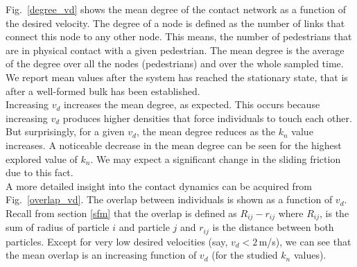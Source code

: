 \documentclass[preprint,12pt]{elsarticle}
\begin{document}
Fig.~\ref{degree_vd} shows the mean degree of the contact network as a function  
of the desired velocity. The degree of a node is defined as the number of links 
that connect this node to any other node. This means, the number of pedestrians 
that are in physical contact with a given pedestrian. The mean degree is the 
average of the degree over all the nodes (pedestrians) and over the whole 
sampled time. We report mean values after the system has reached the stationary 
state, that is after a well-formed bulk has been established.\\

Increasing $v_d$ increases the mean degree, as expected. This occurs because 
increasing $v_d$ produces higher densities that force individuals to touch each 
other. But surprisingly, for a given $v_d$, the mean degree reduces as the $k_n$ 
value increases. A noticeable decrease in the mean degree can be seen for the 
highest explored value of $k_n$. We may expect a significant change in the 
sliding friction due to this fact.\\

A more detailed insight into the contact dynamics can be acquired from 
Fig.~\ref{overlap_vd}. The overlap between individuals is shown as a function of 
$v_d$. Recall from section \ref{sfm} that the overlap is defined as 
$R_{ij}-r_{ij}$ where $R_{ij}$, is the sum of radius of particle $i$ and 
particle $j$ and $r_{ij}$  is the distance between both particles. Except for 
very low desired velocities (say, $v_d<2\,$m/s), we can see that the mean 
overlap is an increasing function of $v_d$ (for the studied $k_n$ values).\\

\end{document}
